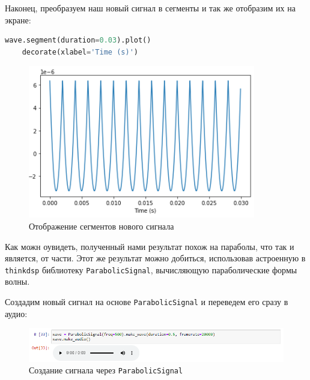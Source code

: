 \documentclass[a4paper]{article}
\begin{document}
            Наконец, преобразуем наш новый сигнал в сегменты и так же отобразим их на экране:
            
\begin{lstlisting}[language=Python, caption= Отображение сегментов нового сигнала]
    wave.segment(duration=0.03).plot()
    decorate(xlabel='Time (s)')
\end{lstlisting}               
            
            \begin{figure}[H]
                \centering
                \includegraphics[width=\textwidth]{ex_6_sawtooth_segment_result.png}
                \caption{Отображение сегментов нового сигнала}
                \label{fig:ex_6_sawtooth_segment_result}
            \end{figure}
            
            Как можн оувидеть, полученный нами результат похож на параболы, что так и является, от части. Этот же результат можно добиться, использовав астроенную в \texttt{thinkdsp} библиотеку \texttt{ParabolicSignal}, вычисляющую параболические формы волны.
            
            Создадим новый сигнал на основе \texttt{ParabolicSignal} и переведем его сразу в аудио:
            
            \begin{figure}[H]
                \centering
                \includegraphics[width=\textwidth]{ex_6_parabolicSignal_audio.png}
                \caption{Создание сигнала через \texttt{ParabolicSignal}}
                \label{fig:ex_6_parabolicSignal_audio}
            \end{figure}
            
\end{document}
